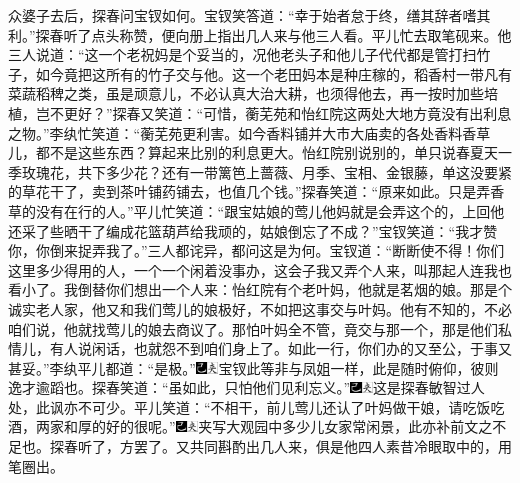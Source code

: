 众婆子去后，探春问宝钗如何。宝钗笑答道：``幸于始者怠于终，缮其辞者嗜其利。''探春听了点头称赞，便向册上指出几人来与他三人看。平儿忙去取笔砚来。他三人说道：``这一个老祝妈是个妥当的，况他老头子和他儿子代代都是管打扫竹子，如今竟把这所有的竹子交与他。这一个老田妈本是种庄稼的，稻香村一带凡有菜蔬稻稗之类，虽是顽意儿，不必认真大治大耕，也须得他去，再一按时加些培植，岂不更好？''探春又笑道：``可惜，蘅芜苑和怡红院这两处大地方竟没有出利息之物。''李纨忙笑道：``蘅芜苑更利害。如今香料铺并大市大庙卖的各处香料香草儿，都不是这些东西？算起来比别的利息更大。怡红院别说别的，单只说春夏天一季玫瑰花，共下多少花？还有一带篱笆上蔷薇、月季、宝相、金银藤，单这没要紧的草花干了，卖到茶叶铺药铺去，也值几个钱。''探春笑道：``原来如此。只是弄香草的没有在行的人。''平儿忙笑道：``跟宝姑娘的莺儿他妈就是会弄这个的，上回他还采了些晒干了编成花篮葫芦给我顽的，姑娘倒忘了不成？''宝钗笑道：``我才赞你，你倒来捉弄我了。''三人都诧异，都问这是为何。宝钗道：``断断使不得！你们这里多少得用的人，一个一个闲着没事办，这会子我又弄个人来，叫那起人连我也看小了。我倒替你们想出一个人来：怡红院有个老叶妈，他就是茗烟的娘。那是个诚实老人家，他又和我们莺儿的娘极好，不如把这事交与叶妈。他有不知的，不必咱们说，他就找莺儿的娘去商议了。那怕叶妈全不管，竟交与那一个，那是他们私情儿，有人说闲话，也就怨不到咱们身上了。如此一行，你们办的又至公，于事又甚妥。''李纨平儿都道：``是极。''{\includegraphics[width=3mm]{../Images/00003}\includegraphics[width=3mm]{../Images/00012}\footnotesize \kaishu 宝钗此等非与凤姐一样，此是随时俯仰，彼则逸才逾蹈也。}探春笑道：``虽如此，只怕他们见利忘义。''{\includegraphics[width=3mm]{../Images/00003}\includegraphics[width=3mm]{../Images/00012}\footnotesize \kaishu 这是探春敏智过人处，此讽亦不可少。}平儿笑道：``不相干，前儿莺儿还认了叶妈做干娘，请吃饭吃酒，两家和厚的好的很呢。''{\includegraphics[width=3mm]{../Images/00003}\includegraphics[width=3mm]{../Images/00012}\footnotesize \kaishu 夹写大观园中多少儿女家常闲景，此亦补前文之不足也。}探春听了，方罢了。又共同斟酌出几人来，俱是他四人素昔冷眼取中的，用笔圈出。

